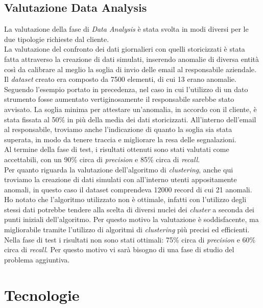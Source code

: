 \subsection{Valutazione Data Analysis}
La valutazione della fase di \emph{Data Analysis} è stata svolta in modi diversi per le due tipologie richieste dal cliente.
\\
La valutazione del confronto dei dati giornalieri con quelli storicizzati è stata fatta attraverso la creazione di dati simulati, inserendo anomalie di diversa entità così da calibrare al meglio la soglia di invio delle email al responsabile aziendale. Il \emph{dataset} creato era composto da 7500 elementi, di cui 13 erano anomalie.
\\
Seguendo l'esempio portato in precedenza, nel caso in cui l'utilizzo di un dato strumento fosse aumentato vertiginosamente il responsabile sarebbe stato avvisato. La soglia minima per attestare un'anomalia, in accordo con il cliente, è stata fissata al 50\% in più della media dei dati storicizzati. All'interno dell'email al responsabile, troviamo anche l'indicazione di quanto la soglia sia stata superata, in modo da tenere traccia e migliorare la resa delle segnalazioni.
\\
Al termine della fase di test, i risultati ottenuti sono stati valutati come accettabili, con un 90\% circa di \emph{precision} e 85\% circa di \emph{recall}.
\\
Per quanto riguarda la valutazione dell'algoritmo di \emph{clustering}, anche qui troviamo la creazione di dati simulati con all'interno utenti appositamente anomali, in questo caso il dataset comprendeva 12000 record di cui 21 anomali. Ho notato che l'algoritmo utilizzato non è ottimale, infatti con l'utilizzo degli stessi dati potrebbe tendere alla scelta di diversi nuclei dei \emph{cluster} a seconda dei punti iniziali dell'algoritmo. Per questo motivo la valutazione è soddisfacente, ma migliorabile tramite l'utilizzo di algoritmi di \emph{clustering} più precisi ed efficienti. Nella fase di test i risultati non sono stati ottimali: 75\% circa di \emph{precision} e 60\% circa di \emph{recall}. Per questo motivo vi sarà bisogno di una fase di studio del problema aggiuntiva.

\section{Tecnologie}\label{Tecnologie}
